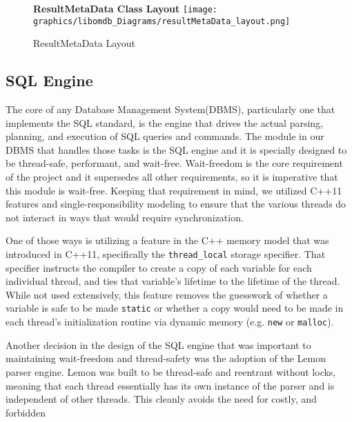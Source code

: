 \documentclass[letterpaper, 12pt]{article}
\renewcommand{\includegraphics}[2][]{\fbox{}}
\begin{document}
  \begin{figure}
    \centering
    \textbf{ResultMetaData Class Layout}
    \texttt{[image: graphics/libomdb\_Diagrams/resultMetaData\_layout.png]}
    \caption{ResultMetaData Layout}
  \end{figure}
  
  \newpage
  \subsection{SQL Engine}
  The core of any Database Management System(DBMS), particularly one that implements the SQL standard, is the
  engine that drives the actual parsing, planning, and execution of SQL queries and commands.
  The module in our DBMS that handles those tasks is the SQL engine and it is specially designed to 
  be thread-safe, performant, and wait-free. Wait-freedom is the core requirement of the project
  and it supersedes all other requirements, so it is imperative that this module is wait-free. Keeping
  that requirement in mind, we utilized C++11 features and single-responsibility modeling to 
  ensure that the various threads do not interact in ways that would require synchronization.
  \par\vspace{\baselineskip}
  One of those ways is utilizing a feature in the C++ memory model that was introduced in C++11, specifically
  the \lstinline[basicstyle=\ttfamily]|thread_local| storage specifier. That specifier instructs the compiler
  to create a copy of each variable for each individual thread, and ties that variable's lifetime
  to the lifetime of the thread. While not used extensively, this feature removes the guesswork 
  of whether a variable is safe to be made \lstinline[basicstyle=\ttfamily]|static| or whether a copy
  would need to be made in each thread's initialization routine via dynamic memory (e.g.
  \lstinline[basicstyle=\ttfamily]|new| or \lstinline[basicstyle=\ttfamily]|malloc|).
  \par\vspace{\baselineskip}
  Another decision in the design of the SQL engine that was important to maintaining wait-freedom and 
  thread-safety was the adoption of the Lemon parser engine. Lemon was built to be thread-safe and 
  reentrant without locks, meaning that each thread essentially has its own instance of the parser
  and is independent of other threads. This cleanly avoids the need for costly, and forbidden
\end{document}
